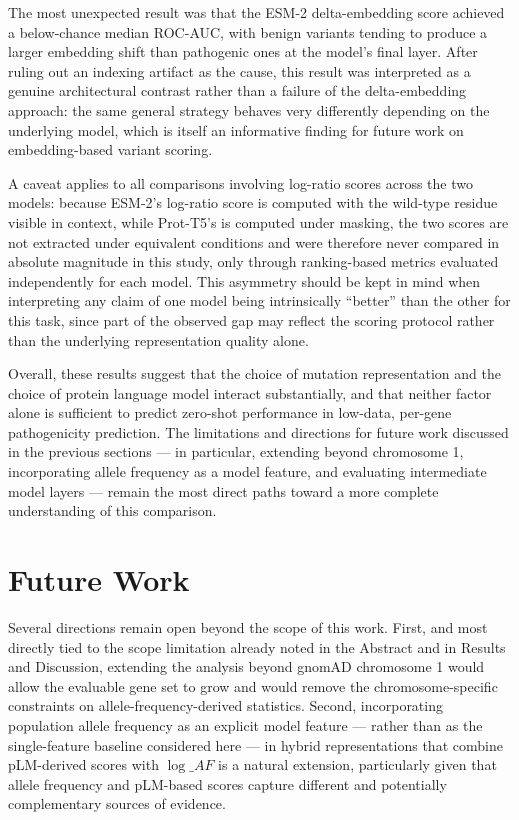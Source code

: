 \documentclass[12pt]{article}
\begin{document}
The most unexpected result was that the ESM-2 delta-embedding score achieved a below-chance median ROC-AUC, with benign variants tending to produce a larger embedding shift than pathogenic ones at the model's final layer. After ruling out an indexing artifact as the cause, this result was interpreted as a genuine architectural contrast rather than a failure of the delta-embedding approach: the same general strategy behaves very differently depending on the underlying model, which is itself an informative finding for future work on embedding-based variant scoring.

A caveat applies to all comparisons involving log-ratio scores across the two models: because ESM-2's log-ratio score is computed with the wild-type residue visible in context, while Prot-T5's is computed under masking, the two scores are not extracted under equivalent conditions and were therefore never compared in absolute magnitude in this study, only through ranking-based metrics evaluated independently for each model. This asymmetry should be kept in mind when interpreting any claim of one model being intrinsically ``better'' than the other for this task, since part of the observed gap may reflect the scoring protocol rather than the underlying representation quality alone.

Overall, these results suggest that the choice of mutation representation and the choice of protein language model interact substantially, and that neither factor alone is sufficient to predict zero-shot performance in low-data, per-gene pathogenicity prediction. The limitations and directions for future work discussed in the previous sections --- in particular, extending beyond chromosome 1, incorporating allele frequency as a model feature, and evaluating intermediate model layers --- remain the most direct paths toward a more complete understanding of this comparison.

\section{Future Work}

Several directions remain open beyond the scope of this work. First, and most directly tied to the scope limitation already noted in the Abstract and in Results and Discussion, extending the analysis beyond gnomAD chromosome 1 would allow the evaluable gene set to grow and would remove the chromosome-specific constraints on allele-frequency-derived statistics. Second, incorporating population allele frequency as an explicit model feature --- rather than as the single-feature baseline considered here --- in hybrid representations that combine pLM-derived scores with $\log\_AF$ is a natural extension, particularly given that allele frequency and pLM-based scores capture different and potentially complementary sources of evidence.
\end{document}
